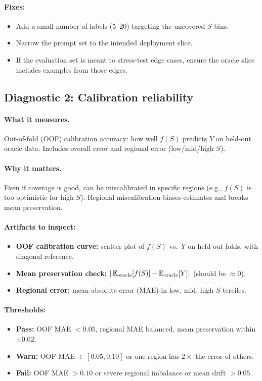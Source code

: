 \paragraph{Fixes:}
\begin{itemize}
\item Add a small number of labels (5--20) targeting the uncovered $S$ bins.
\item Narrow the prompt set to the intended deployment slice.
\item If the evaluation set is meant to stress-test edge cases, ensure the oracle slice includes examples from those edges.
\end{itemize}

\subsection{Diagnostic 2: Calibration reliability}

\paragraph{What it measures.} Out-of-fold (OOF) calibration accuracy: how well $f(S)$ predicts $Y$ on held-out oracle data. Includes overall error and regional error (low/mid/high $S$).

\paragraph{Why it matters.} Even if coverage is good, \autocal{} can be miscalibrated in specific regions (e.g., $f(S)$ is too optimistic for high $S$). Regional miscalibration biases estimates and breaks mean preservation.

\paragraph{Artifacts to inspect:}
\begin{itemize}
\item \textbf{OOF calibration curve:} scatter plot of $f(S)$ vs.\ $Y$ on held-out folds, with diagonal reference.
\item \textbf{Mean preservation check:} $|\operatorname{\mathbb{E}}_{\text{oracle}}[f(S)] - \operatorname{\mathbb{E}}_{\text{oracle}}[Y]|$ (should be $\approx 0$).
\item \textbf{Regional error:} mean absolute error (MAE) in low, mid, high $S$ terciles.
\end{itemize}

\paragraph{Thresholds:}
\begin{itemize}
\item \textbf{Pass:} OOF MAE $< 0.05$, regional MAE balanced, mean preservation within $\pm 0.02$.
\item \textbf{Warn:} OOF MAE $\in [0.05, 0.10]$ or one region has $2\times$ the error of others.
\item \textbf{Fail:} OOF MAE $> 0.10$ or severe regional imbalance or mean drift $> 0.05$.
\end{itemize}

